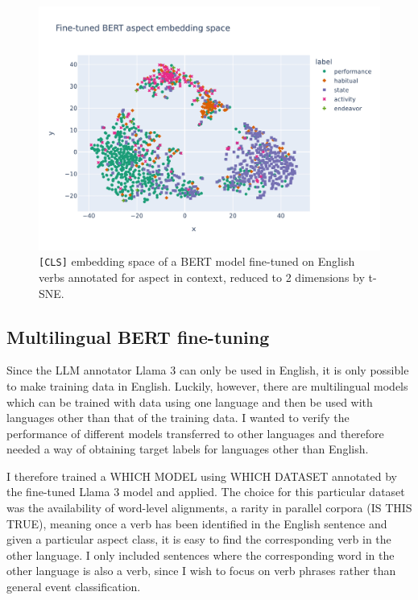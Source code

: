 \begin{figure}
    \includegraphics[width=\textwidth]{img/aspect_latent_space.jpeg}
    \caption{\texttt{[CLS]} embedding space of a BERT model fine-tuned on English verbs annotated for aspect in context, reduced to 2 dimensions by t-SNE.}
    \label{fig:fine-tuned_aspect_latent_space}
\end{figure}


\subsection{Multilingual BERT fine-tuning}
Since the LLM annotator Llama 3 can only be used in English, it is only possible to make training data in English. Luckily, however, there are multilingual models which can be trained with data using one language and then be used with languages other than that of the training data. I wanted to verify the performance of different models transferred to other languages and therefore needed a way of obtaining target labels for languages other than English.

I therefore trained a WHICH MODEL using WHICH DATASET annotated by the fine-tuned Llama 3 model and applied. The choice for this particular dataset was the availability of word-level alignments, a rarity in parallel corpora (IS THIS TRUE), meaning once a verb has been identified in the English sentence and given a particular aspect class, it is easy to find the corresponding verb in the other language. I only included sentences where the corresponding word in the other language is also a verb, since I wish to focus on verb phrases rather than general event classification.

